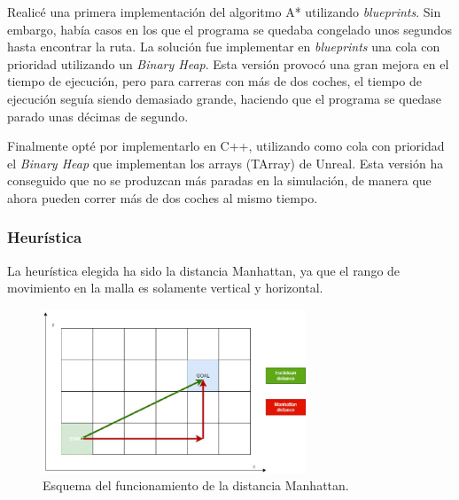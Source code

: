 Realicé una primera implementación del algoritmo A* utilizando \textit{blueprints}. Sin embargo, había casos en los que el programa se quedaba congelado unos segundos hasta encontrar la ruta. La solución fue implementar en \textit{blueprints} una cola con prioridad utilizando un \textit{Binary Heap}. Esta versión provocó una gran mejora en el tiempo de ejecución, pero para carreras con más de dos coches, el tiempo de ejecución seguía siendo demasiado grande, haciendo que el programa se quedase parado unas décimas de segundo.

\bigskip

Finalmente opté por implementarlo en C++, utilizando como cola con prioridad el \textit{Binary Heap} que implementan los arrays (TArray) de Unreal. Esta versión ha conseguido que no se produzcan más paradas en la simulación, de manera que ahora pueden correr más de dos coches al mismo tiempo.

\subsubsection{Heurística}




La heurística elegida ha sido la distancia Manhattan, ya que el rango de movimiento en la malla es solamente vertical y horizontal.

\begin{figure}[H]
    \centering
    \includegraphics[width=0.7\textwidth]{imagenes/converted/Euclidean-and-Manhattan-distance-comparison-3235-Optimizations-The-first-optimization.jpg}
    \caption{Esquema del funcionamiento de la distancia Manhattan\cite{gameai}.}
    \label{fig:manhattan}
\end{figure}


